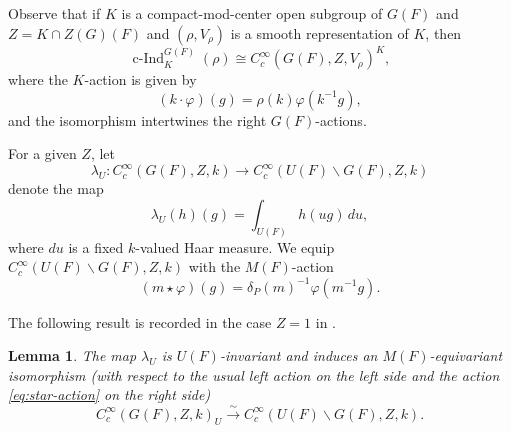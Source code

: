 \documentclass[reqno]{amsart}
\numberwithin{equation}{subsection}
\newcommand{\co}{\colon}
\DeclareMathOperator{\cInd}{c-Ind}
\newtheorem{lemma}[thm]{Lemma}
\theoremstyle{remark}
\numberwithin{equation}{subsection}
\numberwithin{figure}{subsection}
\begin{document}
Observe that if $K$ is a compact-mod-center open subgroup of $G(F)$ and $Z = K \cap Z(G)(F)$ and $(\rho, V_\rho)$ is a smooth representation of $K$, then
\[
\cInd_K^{G(F)}(\rho) \cong C_c^\infty(G(F), Z, V_\rho)^K,
\]
where the $K$-action is given by
\[
(k \cdot \varphi)(g) = \rho(k)\varphi(k^{-1}g),
\]
and the isomorphism intertwines the right $G(F)$-actions.

For a given $Z$, let
\[
\lambda_U\co C_c^\infty(G(F),Z,k)
\longrightarrow C_c^\infty(U(F)\backslash G(F),Z,k)
\]
denote the map
\begin{equation}\label{eq:lambda-u}
\lambda_U(h)(g)=\int_{U(F)} h(ug)\,du,
\end{equation}
where $du$ is a fixed $k$-valued Haar measure. We equip $C_c^\infty(U(F)\backslash G(F),Z,k)$ with the $M(F)$-action
\begin{equation}\label{eq:star-action}
(m\star \varphi)(g)=\delta_P(m)^{-1}\varphi(m^{-1}g).
\end{equation}

The following result is recorded in the case $Z = 1$ in \cite[Remarque~3.4]{Dat09}.


\begin{lemma}\label{lem:function-coinvariants}
The map $\lambda_U$ is $U(F)$-invariant and induces an $M(F)$-equivariant isomorphism (with respect to the usual left action on the left side and the action \eqref{eq:star-action} on the right side)
\begin{equation}\label{eq:function-coinvariant-iso}
C_c^\infty(G(F),Z,k)_U
\xrightarrow{\sim}
C_c^\infty(U(F)\backslash G(F),Z,k).
\end{equation}
\end{lemma}
\end{document}
